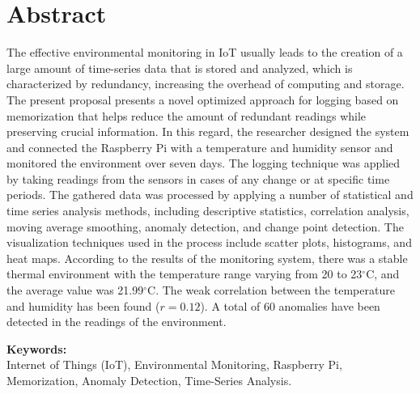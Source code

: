 \documentclass[12pt,a4paper]{report}
\begin{document}
\chapter*{Abstract}
The effective environmental monitoring in IoT usually leads to the creation of a large amount of time-series data that is stored and analyzed, which is characterized by redundancy, increasing the overhead of computing and storage. The present proposal presents a novel optimized approach for logging based on memorization that helps reduce the amount of redundant readings while preserving crucial information. In this regard, the researcher designed the system and connected the Raspberry Pi with a temperature and humidity sensor and monitored the environment over seven days. The logging technique was applied by taking readings from the sensors in cases of any change or at specific time periods. The gathered data was processed by applying a number of statistical and time series analysis methods, including descriptive statistics, correlation analysis, moving average smoothing, anomaly detection, and change point detection. The visualization techniques used in the process include scatter plots, histograms, and heat maps. According to the results of the monitoring system, there was a stable thermal environment with the temperature range varying from 20 to 23$^\circ$C, and the average value was 21.99$^\circ$C. The weak correlation between the temperature and humidity has been found ($r=0.12$). A total of 60 anomalies have been detected in the readings of the environment.

\vspace{1cm}
\textbf{Keywords:}\\
Internet of Things (IoT), Environmental Monitoring, Raspberry Pi, Memorization, Anomaly Detection, Time-Series Analysis.

\tableofcontents
\listoftables
\listoffigures
\end{document}
